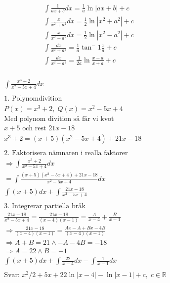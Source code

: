 \newpage
\begin{multicols}{2}
\begin{align*}
  &\quad  \int \frac{1}{ax+b}dx = \frac{1}{a} \ln{|ax+b|} +c \\
  &\quad  \int \frac{x}{x^2+a^2}dx = \frac{1}{2} \ln{|x^2+a^2|} +c \\
  &\quad  \int \frac{x}{x^2-a^2}dx = \frac{1}{2} \ln{|x^2-a^2|} +c \\
  &\quad  \int \frac{dx}{x^2+a^2} = \frac{1}{a} \tan^-1{\frac{x}{a}} +c \\
  &\quad  \int \frac{dx}{x^2-a^2} = \frac{1}{2a} \ln{\frac{x-a}{x+a}} +c \\
\end{align*}


\begin{align*}
  &\int \frac{x^3+2}{x^2-5x+4}dx \\
  &\\
  &\text{1. Polynomdivition} \\
  &P(x)=x^3+2, \; Q(x)=x^2-5x+4 \\
  &\text{Med polynom divition så får vi kvot} \\
  &x+5 \text{ och rest } 21x-18 \\
  &x^3+2=(x+5)(x^2-5x+4) + 21x-18 \\
  &\\
  &\text{2. Faktorisera nämnaren i realla faktorer} \\
  &\Rightarrow \int \frac{x^3+2}{x^2-5x+4}dx \\
  &= \int \frac{(x+5)(x^2-5x+4) + 21x-18}{x^2-5x+4}dx \\
  &\int (x+5)dx + \int \frac{21x-18}{x^2-5x+4} \\
  &\\
  &\text{3. Integrerar partiella bråk} \\
  &\frac{21x-18}{x^2-5x+4} = \frac{21x-18}{(x-4)(x-1)} = \frac{A}{x-4} + \frac{B}{x-1} \\
  &\Rightarrow \frac{21x-18}{(x-4)(x-1)} = \frac{Ax-A+Bx-4B}{(x-4)(x-1)} \\
  &\Rightarrow A+B=21 \land -A-4B=-18 \\
  &\Rightarrow A=22 \land B=-1 \\
  &\int (x+5)dx + \int \frac{22}{x-4}dx - \int \frac{1}{x-1}dx \\
  &\\
  &\text{Svar: } x^2/2 +5x +22\ln{|x-4|} -\ln{|x-1|} +c, \; c \in \mathbb{R} \\
\end{align*}




\end{multicols}
